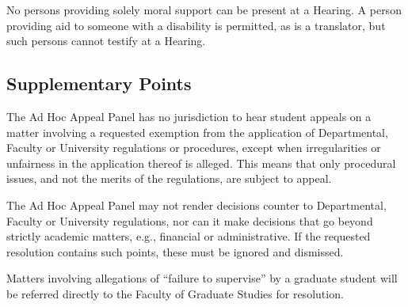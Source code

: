  No persons providing solely moral support can be present at a
Hearing.  A person providing aid to someone with a disability is permitted, as
is a translator, but such persons cannot testify at a Hearing.


\subsection{Supplementary Points}

 The Ad Hoc Appeal Panel has no jurisdiction to hear student appeals
on a matter involving a requested exemption from the application of
Departmental, Faculty or University regulations or procedures, except when
irregularities or unfairness in the application thereof is alleged.  This means
that only procedural issues, and not the merits of the regulations, are subject
to appeal.

 The Ad Hoc Appeal Panel may not render decisions counter to
Departmental, Faculty or University regulations, nor can it make decisions that
go beyond strictly academic matters, e.g., financial or administrative.  If the
requested resolution contains such points, these must be ignored and dismissed.   

 Matters involving allegations of ``failure to supervise'' by a
graduate student will be referred directly to the Faculty of Graduate Studies
for resolution.  


